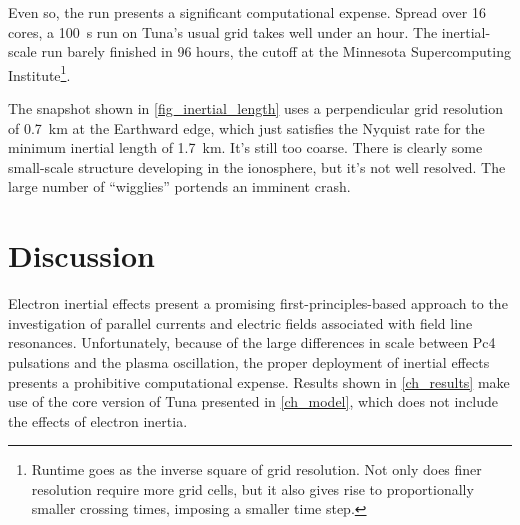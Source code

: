 Even so, the run presents a significant computational expense. Spread over 16 cores, a \SI{100}{\s} run on Tuna's usual grid takes well under an hour. The inertial-scale run barely finished in 96 hours, the cutoff at the Minnesota Supercomputing Institute\footnote{Runtime goes as the inverse square of grid resolution. Not only does finer resolution require more grid cells, but it also gives rise to proportionally smaller crossing times, imposing a smaller time step. }.

The snapshot shown in \cref{fig_inertial_length} uses a perpendicular grid resolution of \SI{0.7}{\km} at the Earthward edge, which just satisfies the Nyquist rate for the minimum inertial length of \SI{1.7}{\km}. It's still too coarse. There is clearly some small-scale structure developing in the ionosphere, but it's not well resolved. The large number of ``wigglies'' portends an imminent crash. 


\section{Discussion}




Electron inertial effects present a promising first-principles-based approach to the investigation of parallel currents and electric fields associated with field line resonances. Unfortunately, because of the large differences in scale between Pc4 pulsations and the plasma oscillation, the proper deployment of inertial effects presents a prohibitive computational expense. Results shown  in \cref{ch_results} make use of the core version of Tuna presented in \cref{ch_model}, which does not include the effects of electron inertia. 

